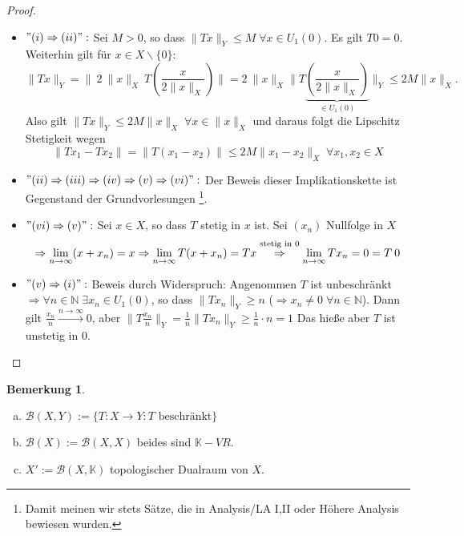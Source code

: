 \documentclass[ngerman]{report}
\theoremstyle{plain}%
\theoremstyle{definition}%
\theoremstyle{myStyle}
\newtheorem{bem}[thm]{Bemerkung}
\newcommand{\N}{\mathbb{N}}
\newcommand{\K}{\mathbb{K}}
\newcommand{\B}{\mathcal{B}} %
\newcommand{\norm}[1]{\|#1\|}
\newcommand{\df}[1][]{%
	\overset{#1}{\Rightarrow}
}
\newcommand{\U}[2][1]{U_{#1}(#2)} %
\newcommand{\EK}{\U{0}} %
\newcommand{\limes}[1][\infty]{\lim_{n \to #1}}
\begin{document}
	\begin{proof}
		\begin{itemize}[]
			\item $"(i) \df (ii)":$ 
				Sei $M > 0$, so dass $\norm{Tx}_Y \leq M \; \forall x \in U_1(0)$. Es gilt $T0 = 0$.
				Weiterhin gilt für $x \in X\backslash \{0\}$: 
				$$\norm{Tx}_Y = \norm{\: 2 \: \norm{x}_X \: T\left(\frac{x}{2 \norm{x}_X}\right)}
			  =	2 \: \norm{x}_X\norm{T\underbrace{\left(\frac{x}{2 \norm{x}_X}\right)}_{\in \EK}}_Y
				\leq 2 M \norm{x}_X.$$
				Also gilt $\norm{Tx}_Y \leq 2M \norm{x}_X \; \forall x \in \norm{x}_X$ 
				und daraus folgt die Lipschitz Stetigkeit wegen 
				$$ \norm{Tx_1 - Tx_2} = \norm{ T(x_1 - x_2)} \leq 2 M \norm{x_1 - x_2}_X \; \forall x_1, x_2\in X$$ 
											
			\item $"(ii) \df (iii) \df (iv) \df (v) \df (vi)":$ 
				Der Beweis dieser Implikationskette ist Gegenstand der Grundvorlesungen \footnote{Damit meinen wir stets Sätze, die in Analysis\slash LA I,II oder Höhere Analysis bewiesen wurden.}.
				
			\item $"(vi) \df (v)":$ 
				Sei $x \in X$, so dass $T$ stetig in $x$ ist. Sei $(x_n)$ Nullfolge in $X$
				$$\df \limes (x + x_n) = x \df \limes T(x+x_n) = Tx 
				\overset{\text{stetig in 0}}{\df}\limes T x_n = 0 = T\:0$$ 

			\item $"(v) \df (i)":$ Beweis durch Widerspruch:
				Angenommen $T$ ist unbeschränkt $\df \forall n \in \N \; \exists x_n \in \EK$, so dass
				$\norm{Tx_n}_Y \geq n$ ($\df x_n \not = 0 \; \forall n\in\N$). 
				Dann gilt $\frac{x_n}{n} \overset{n\to\infty}{\longrightarrow} 0$,
				aber $\norm{T\frac{x_n}{n}}_Y = \frac{1}{n} \norm{T x_n}_Y \geq \frac{1}{n} \cdot n = 1$
				Das hieße aber $T$ ist unstetig in 0. 

		\end{itemize}
	\end{proof}

	\begin{bem} 
		\begin{enumerate}[a)]
			\item $\B(X,Y) := \{ T: X\to Y: T \text{ beschränkt}\}$
			\item $\B(X) := \B(X,X)$ beides sind $\K-VR$.
			\item $X' := \B(X,\K)$ topologischer Dualraum von	$X$.
		\end{enumerate}
	\end{bem}					
	
\end{document}
